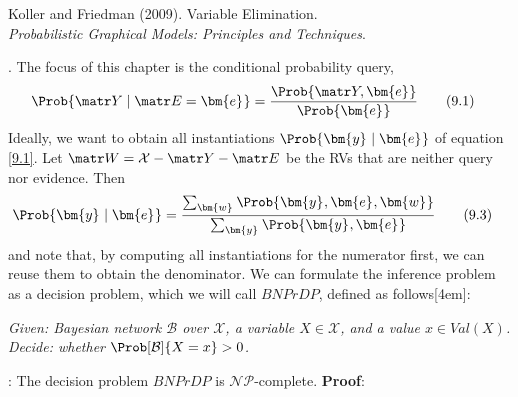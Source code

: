 \documentclass[11pt]{article}
\renewcommand\vec[2][]{\bm{#2}_{#1}}
\newcommand\p{\Needspace{10\baselineskip} \noindent}
\newcommand\tlab[1]{\tag{#1}\label{#1}}
\begin{document}
\vspace{-1.7em}
{\scriptsize Koller and Friedman (2009). Variable Elimination.\\ \textit{Probabilistic Graphical Models: Principles and Techniques}.\\ }

\p {}. The focus of this chapter is the conditional probability query,
\begin{align}
	\Prob{\matr Y \mid \matr E = \vec e}
	&= \frac{  \Prob{\matr Y, \vec e}  }{ \Prob{\vec e}  } \tlab{9.1}
\end{align}
Ideally, we want to obtain all instantiations $\Prob{\vec y \mid \vec e}$ of equation \ref{9.1}. Let $\matr W = \mathcal{X} - \matr Y - \matr E$ be the RVs that are neither query nor evidence. Then
\begin{align}
	\Prob{\vec y \mid \vec e} 
	&= \frac { \sum_{\vec w} \Prob{\vec y, \vec e, \vec w}  }{ \sum_{\vec y}  \Prob{\vec y, \vec e} } \tlab{9.3}
\end{align}
and note that, by computing all instantiations for the numerator first, we can reuse them to obtain the denominator. We can formulate the inference problem as a decision problem, which we will call $BNPrDP$, defined as follows[4em]:
\vspace{-0.5em}
\begin{center}
	{\itshape 
	Given: Bayesian network $\mathcal B$ over $\mathcal X$, a variable $X \in \mathcal{X}$, and a value $x \in Val(X)$. \\
	Decide: whether $\Prob[\mathcal B]{X = x} > 0$. 
	}
\end{center}
: The decision problem $BNPrDP$ is $\mathcal{N}\mathcal{P}$-complete. \textbf{Proof}:
\end{document}
